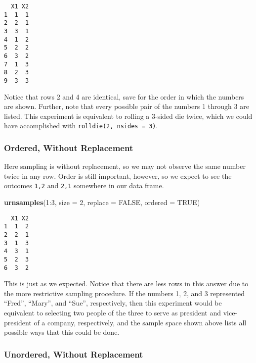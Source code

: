 \documentclass[]{book}
\newenvironment{Shaded}{\begin{snugshade}}{\end{snugshade}}
\newcommand{\KeywordTok}[1]{\textcolor[rgb]{0.13,0.29,0.53}{\textbf{{#1}}}}
\newcommand{\DataTypeTok}[1]{\textcolor[rgb]{0.13,0.29,0.53}{{#1}}}
\newcommand{\DecValTok}[1]{\textcolor[rgb]{0.00,0.00,0.81}{{#1}}}
\newcommand{\OtherTok}[1]{\textcolor[rgb]{0.56,0.35,0.01}{{#1}}}
\newcommand{\NormalTok}[1]{{#1}}
\numberwithin{equation}{chapter}
\numberwithin{figure}{chapter}
\theoremstyle{plain}
\theoremstyle{definition}
\theoremstyle{remark}
\theoremstyle{definition}
\theoremstyle{definition}
\theoremstyle{remark}
\begin{document}
\begin{verbatim}
  X1 X2
1  1  1
2  2  1
3  3  1
4  1  2
5  2  2
6  3  2
7  1  3
8  2  3
9  3  3
\end{verbatim}

Notice that rows 2 and 4 are identical, save for the order in which the
numbers are shown. Further, note that every possible pair of the numbers
1 through 3 are listed. This experiment is equivalent to rolling a
3-sided die twice, which we could have accomplished with
\texttt{rolldie(2,\ nsides\ =\ 3)}.

\subsubsection{Ordered, Without
Replacement}\label{ordered-without-replacement}

Here sampling is without replacement, so we may not observe the same
number twice in any row. Order is still important, however, so we expect
to see the outcomes \texttt{1,2} and \texttt{2,1} somewhere in our data
frame.

\begin{Shaded}
\begin{Highlighting}[]
\KeywordTok{urnsamples}\NormalTok{(}\DecValTok{1}\NormalTok{:}\DecValTok{3}\NormalTok{, }\DataTypeTok{size =} \DecValTok{2}\NormalTok{, }\DataTypeTok{replace =} \OtherTok{FALSE}\NormalTok{, }\DataTypeTok{ordered =} \OtherTok{TRUE}\NormalTok{)}
\end{Highlighting}
\end{Shaded}

\begin{verbatim}
  X1 X2
1  1  2
2  2  1
3  1  3
4  3  1
5  2  3
6  3  2
\end{verbatim}

This is just as we expected. Notice that there are less rows in this
answer due to the more restrictive sampling procedure. If the numbers 1,
2, and 3 represented ``Fred'', ``Mary'', and ``Sue'', respectively, then
this experiment would be equivalent to selecting two people of the three
to serve as president and vice-president of a company, respectively, and
the sample space shown above lists all possible ways that this could be
done.

\subsubsection{Unordered, Without
Replacement}\label{unordered-without-replacement}
\end{document}

